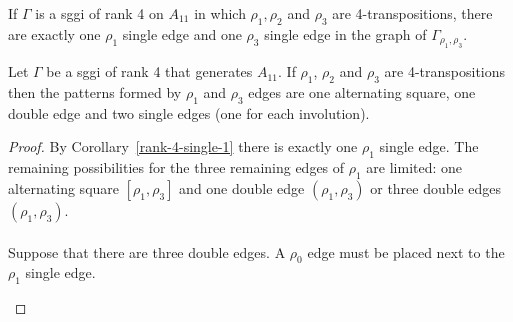 \begin{corollary}
  \label{rank-4-single-1}
    If $\Gamma$ is a sggi of rank 4 on $A_{11}$ in which $\rho_1, \rho_2$ and $\rho_3$ are 4-transpositions, there are exactly one $\rho_1$ single edge and one $\rho_3$ single edge in the graph of $\Gamma_{\rho_1, \rho_3}$.
\end{corollary}

\begin{lemma}
  \label{rank-4-3-patterns}
  Let $\Gamma$ be a sggi of rank 4 that generates $A_{11}$. If $\rho_1$, $\rho_2$ and $\rho_3$ are 4-transpositions then the patterns formed by $\rho_1$ and $\rho_3$ edges are one alternating square, one double edge and two single edges (one for each involution).
\end{lemma}

\begin{proof}
  By Corollary~\ref{rank-4-single-1} there is exactly one $\rho_1$ single edge. The remaining possibilities for the three remaining edges of $\rho_1$ are limited: one alternating square $[\rho_1, \rho_3]$ and one double edge $(\rho_1, \rho_3)$ or three double edges $(\rho_1, \rho_3)$.

  \paragraph{}
  Suppose that there are three double edges. A $\rho_0$ edge must be placed next to the $\rho_1$ single edge.

    \begin{figure}[H]
      \begin{center}
\end{center}
\end{figure}
\end{proof}
